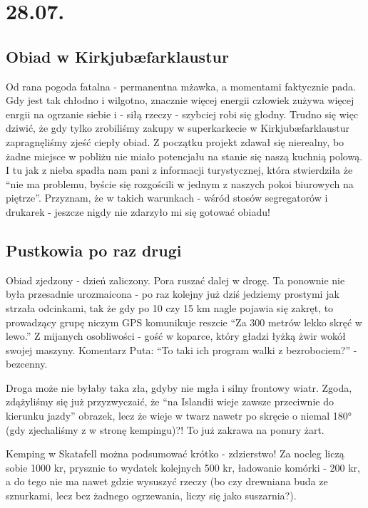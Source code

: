 \chapter*{28.07.}

\section*{Obiad w Kirkjubæfarklaustur}

Od rana pogoda fatalna - permanentna mżawka, a momentami faktycznie pada. Gdy jest tak chłodno i wilgotno, znacznie więcej energii człowiek zużywa więcej enrgii na ogrzanie siebie i - siłą rzeczy - szybciej robi się głodny. Trudno się więc dziwić, że gdy tylko zrobiliśmy zakupy w superkarkecie w Kirkjubæfarklaustur zapragnęliśmy zjeść ciepły obiad. Z początku projekt zdawał się nierealny, bo żadne miejsce w pobliżu nie miało potencjału na stanie się naszą kuchnią polową. I tu jak z nieba spadła nam pani z informacji turystycznej, która stwierdziła że “nie ma problemu, byście się rozgościli w jednym z naszych pokoi biurowych na piętrze”. Przyznam, że w takich warunkach - wśród stosów segregatorów i drukarek - jeszcze nigdy nie zdarzyło mi się gotować obiadu!


\section*{Pustkowia po raz drugi}

Obiad zjedzony - dzień zaliczony. Pora ruszać dalej w drogę. Ta ponownie nie była przesadnie urozmaicona - po raz kolejny już dziś jedziemy prostymi jak strzała odcinkami, tak że gdy po 10 czy 15 km nagle pojawia się zakręt, to prowadzący grupę niczym GPS komunikuje reszcie “Za 300 metrów lekko skręć w lewo.” Z mijanych osobliwości - gość w koparce, który gładzi łyżką żwir wokół swojej maszyny. Komentarz Puta: “To taki ich program walki z bezrobociem?” - bezcenny.


Droga może nie byłaby taka zła, gdyby nie mgła i silny frontowy wiatr. Zgoda, zdążyliśmy się już przyzwyczaić, że “na Islandii wieje zawsze przeciwnie do kierunku jazdy” {obrazek}, lecz że wieje w twarz nawetr po skręcie o niemal 180° (gdy zjechaliśmy z  w stronę kempingu)?! To już zakrawa na ponury żart.

Kemping w Skatafell można podsumować krótko - zdzierstwo! Za nocleg liczą sobie 1000 kr, prysznic to wydatek kolejnych 500 kr, ładowanie komórki - 200 kr, a do tego nie ma nawet gdzie wysuszyć rzeczy (bo czy drewniana buda ze sznurkami, lecz bez żadnego ogrzewania, liczy się jako suszarnia?).

